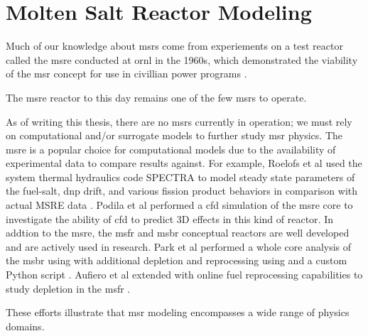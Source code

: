 \chapter{Molten Salt Reactor Modeling}%
\label{ch:chapter2}
Much of our knowledge about \Gls{msr}s come from experiements on a test reactor
called the \Gls{msre} conducted at \Gls{ornl} in the 1960s, which demonstrated
the viability of the \Gls{msr} concept for use in civillian power programs
\cite{haubenreich_experience_1970} \cite{rosenthal_history_1970}.

The \Gls{msre} reactor to this day remains one of the few \Gls{msr}s to operate.

As of writing this thesis, there are no \Gls{msr}s currently in operation; we
must rely on computational and/or surrogate models to further study \Gls{msr}
physics. The \Gls{msre} is a popular choice for computational models due to the
availability of experimental data to compare results against. For example,
Roelofs et al used the system thermal hydraulics code SPECTRA to model steady
state parameters of the fuel-salt, \Gls{dnp} drift, and various fission product
behaviors in comparison with actual MSRE data \cite{roelofs_molten_2021}.
Podila et al performed a \Gls{cfd} simulation of the \Gls{msre} core to
investigate the ability of \Gls{cfd} to predict 3D effects in this kind of
reactor\cite{podila_cfd_2019}. 
In addtion to the \Gls{msre}, the \Gls{msfr}\cite{merle-lucotte_launching_2011}
and \Gls{msbr}\cite{robertson_conceptual_1971} conceptual reactors are well
developed and are actively used in research. Park et al performed a whole core
analysis of the \Gls{msbr} using \MCNPSIX with additional depletion and
reprocessing using \CINDERNINETY and a custom Python script \cite{park_whole_2015}.
Aufiero et al extended \SerpentTWO with online fuel reprocessing capabilities to
study depletion in the \Gls{msfr} \cite{aufiero_extended_2013}.

These efforts illustrate that \Gls{msr} modeling encompasses a wide range of
physics domains.

